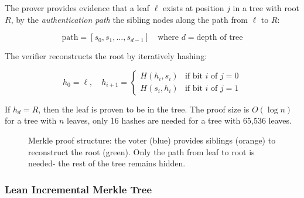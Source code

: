 \documentclass[12pt, a4paper]{report}
\begin{document}
The prover provides evidence that a leaf $\ell$ exists at position $j$ in a tree with root $R$, by the \textit{authentication path} the sibling nodes along the path from $\ell$ to $R$:

\begin{equation}
\text{path} = [s_0, s_1, \ldots, s_{d-1}] \quad \text{where } d = \text{depth of tree}
\label{eq:merkle_path}
\end{equation}

The verifier reconstructs the root by iteratively hashing:

\begin{equation}
h_0 = \ell, \quad h_{i+1} = \begin{cases} H(h_i, s_i) & \text{if bit } i \text{ of } j = 0 \\ H(s_i, h_i) & \text{if bit } i \text{ of } j = 1 \end{cases}
\label{eq:merkle_verify}
\end{equation}

If $h_d = R$, then the leaf is proven to be in the tree. The proof size is $O(\log n)$ for a tree with $n$ leaves, only 16 hashes are needed for a tree with 65,536 leaves.

\begin{figure}[H]
\centering
{}
\caption{Merkle proof structure: the voter (blue) provides siblings (orange) to reconstruct the root (green). Only the path from leaf to root is needed- the rest of the tree remains hidden.}
\label{fig:merkle_proof}
\end{figure}

\subsubsection{Lean Incremental Merkle Tree}
\end{document}
